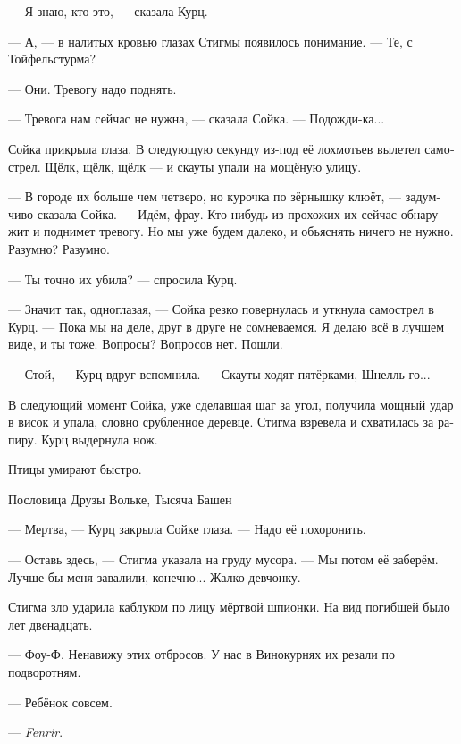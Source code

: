 \documentclass[a4paper,12pt,fleqn]{book}\usepackage{polyglossia}\setdefaultlanguage[babelshorthands=true]{russian}\setotherlanguage{english}\defaultfontfeatures{Ligatures=TeX,Mapping=tex-text}\usepackage{xcolor}\newcommand{\ml}[3]{#2}
\newcommand{\textspace}{\vspace{1em}{\centering\Large\bfseries<...>\par}\vspace{1em}}
\begin{document}
--- Я знаю, кто это, --- сказала Курц.

--- А, --- в налитых кровью глазах Стигмы появилось понимание.
--- Те, с Тойфельстурма?

--- Они.
Тревогу надо поднять.

--- Тревога нам сейчас не нужна, --- сказала Сойка.
--- Подожди-ка...

Сойка прикрыла глаза.
В следующую секунду из-под её лохмотьев вылетел самострел.
Щёлк, щёлк, щёлк --- и скауты упали на мощёную улицу.

--- В городе их больше чем четверо, но курочка по зёрнышку клюёт, --- задумчиво сказала Сойка.
--- Идём, фрау.
Кто-нибудь из прохожих их сейчас обнаружит и поднимет тревогу.
Но мы уже будем далеко, и обьяснять ничего не нужно.
\ml{$0$}
{Разумно?}
{Makes sense?}
\ml{$0$}
{Разумно.}
{Makes sense.''}

--- Ты точно их убила? --- спросила Курц.

--- Значит так, одноглазая, --- Сойка резко повернулась и уткнула самострел в Курц.
--- Пока мы на деле, друг в друге не сомневаемся.
\ml{$0$}
{Я делаю всё в лучшем виде, и ты тоже.}
{I do my best, you do yours.}
\ml{$0$}
{Вопросы?}
{Any questions?}
\ml{$0$}
{Вопросов нет.}
{No questions.''}
Пошли.

--- Стой, --- Курц вдруг вспомнила.
--- Скауты ходят пятёрками, Шнелль го...

В следующий момент Сойка, уже сделавшая шаг за угол, получила мощный удар в висок и упала, словно срубленное деревце.
Стигма взревела и схватилась за рапиру.
Курц выдернула нож.

\textspace

\epigraph
{\ml{$0$}
{Птицы умирают быстро.}
{Birds die fast.}}
{Пословица Друзы Вольке, Тысяча Башен}

--- Мертва, --- Курц закрыла Сойке глаза.
--- Надо её похоронить.

--- Оставь здесь, --- Стигма указала на груду мусора.
--- Мы потом её заберём.
\ml{$0$}
{Лучше бы меня завалили, конечно...}
{It'd better be me than her, of course ...}
\ml{$0$}
{Жалко девчонку.}
{Poor child.''}

Стигма зло ударила каблуком по лицу мёртвой шпионки.
На вид погибшей было лет двенадцать.

\ml{$0$}
{--- Фоу-Ф.}
{``Foe-F.}
\ml{$0$}
{Ненавижу этих отбросов.}
{I hate that scum.}
У нас в Винокурнях их резали по подворотням.

--- Ребёнок совсем.

--- \textit{Fenrir}.
\end{document}
